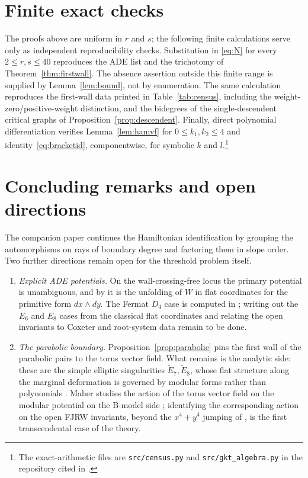 \documentclass[11pt]{amsart}
\theoremstyle{definition}
\theoremstyle{remark}
\begin{document}
\section{Finite exact checks}
\label{sec:cert}

The proofs above are uniform in $r$ and $s$; the following finite calculations
serve only as independent reproducibility checks.  Substitution in
\eqref{eq:N} for every $2\le r,s\le40$ reproduces the ADE list and the
trichotomy of Theorem~\ref{thm:firstwall}.  The absence assertion outside this
finite range is supplied by Lemma~\ref{lem:bound}, not by enumeration.  The
same calculation reproduces the first-wall data printed in
Table~\ref{tab:census}, including the weight-zero/positive-weight distinction,
and the bidegrees of the single-descendent critical graphs of
Proposition~\ref{prop:descendent}.
Finally, direct polynomial differentiation verifies Lemma~\ref{lem:hamvf}
for $0\le k_1,k_2\le4$ and identity~\eqref{eq:bracketid}, componentwise, for
symbolic $k$ and $l$.\footnote{The exact-arithmetic files are
\texttt{src/census.py} and \texttt{src/gkt\_algebra.py} in the repository cited
in \cite{companion}.}
\section*{Concluding remarks and open directions}

The companion paper \cite{companion} continues the Hamiltonian identification
by grouping the automorphisms on rays of boundary degree and factoring them in
slope order.  Two further directions remain open for the threshold problem
itself.

\begin{enumerate}
\item \emph{Explicit ADE potentials.} On the wall-crossing-free locus the
primary potential is unambiguous, and by \cite[Theorem~0.3]{GKT} it is the
unfolding of $W$ in flat coordinates for the primitive form $dx\wedge dy$.
The Fermat $D_4$ case is computed in \cite[Example~4.2.3]{Maher}; writing out
the $E_6$ and $E_8$ cases from the classical flat coordinates
\cite{Saito83,NoumiYamada98} and relating
the open invariants to Coxeter and root-system data remain to be done.
\item \emph{The parabolic boundary.} Proposition~\ref{prop:parabolic} pins the
first wall of the parabolic pairs to the torus vector field. What remains is
the analytic side: these are the simple elliptic singularities
$\widetilde E_{7},\widetilde E_{8}$, whose flat structure along the marginal
deformation is governed by modular forms rather than polynomials
\cite[\S4.2.2]{Maher}.  Maher studies the action of the torus vector field on
the modular potential on the B-model side \cite[Example~5.2.12]{Maher};
identifying the corresponding action on the open FJRW invariants, beyond the
$x^{4}+y^{4}$ jumping of \cite[Example~4.9]{GKTsurvey}, is the first
transcendental case of the theory.
\end{enumerate}
\end{document}
